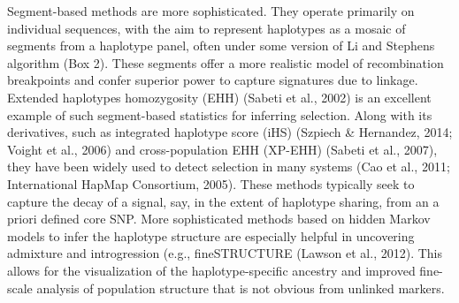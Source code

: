 \documentclass[twocolumn]{bmcart}%
\begin{document}
\begin{strip}
\begin{tcolorbox}[colback=blue!2!white,colframe=blue!50!black,title= Box 2: Population genetic methods that make use of haplotype information]
\begin{multicols}{2}
{Segment-based methods are more sophisticated. They operate primarily on individual sequences, with the aim to represent haplotypes as a mosaic of segments from a haplotype panel, often under some version of Li and Stephens algorithm (Box 2). These segments offer a more realistic model of recombination breakpoints and confer superior power to capture signatures due to linkage. Extended haplotypes homozygosity (EHH) (Sabeti et al., 2002) is an excellent example of such segment-based statistics for inferring selection. Along with its derivatives, such as integrated haplotype score (iHS) (Szpiech \& Hernandez, 2014; Voight et al., 2006) and cross-population EHH (XP-EHH) (Sabeti et al., 2007), they have been widely used to detect selection in many systems (Cao et al., 2011; International HapMap Consortium, 2005). These methods typically seek to capture the decay of a signal, say, in the extent of haplotype sharing, from an a priori defined core SNP. More sophisticated methods based on hidden Markov models to infer the haplotype structure are especially helpful in uncovering admixture and introgression (e.g., fineSTRUCTURE (Lawson et al., 2012). This allows for the visualization of the haplotype-specific ancestry and improved fine-scale analysis of population structure that is not obvious from unlinked markers. }
  \end{multicols}
\end{tcolorbox}
\end{strip}
\end{document}
